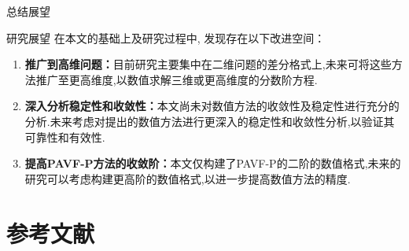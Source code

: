 \documentclass[aspectratio=169]{beamer}
\numberwithin{theorem}{section} %
\numberwithin{equation}{section}%
\numberwithin{figure}{section}%
\numberwithin{table}{section}%
\begin{document}
\begin{frame}{总结展望}
	\begin{block}{研究展望}
		在本文的基础上及研究过程中, 发现存在以下改进空间：
		\begin{enumerate}
			\item \textbf{\textcolor[rgb]{0.227,0.373,0.306}{推广到高维问题：}}目前研究主要集中在二维问题的差分格式上,未来可将这些方法推广至更高维度,以数值求解三维或更高维度的分数阶方程.
			\item \textbf{\textcolor[rgb]{0.227,0.373,0.306}{深入分析稳定性和收敛性：}}本文尚未对数值方法的收敛性及稳定性进行充分的分析.未来考虑对提出的数值方法进行更深入的稳定性和收敛性分析,以验证其可靠性和有效性.
			\item \textbf{\textcolor[rgb]{0.227,0.373,0.306}{提高PAVF-P方法的收敛阶：}}本文仅构建了PAVF-P的二阶的数值格式,未来的研究可以考虑构建更高阶的数值格式,以进一步提高数值方法的精度.
		\end{enumerate}
	\end{block}
\end{frame}
	
\section{参考文献}
\end{document}
